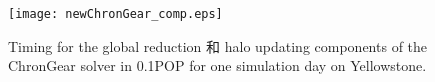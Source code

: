 \begin{figure}[!t]
\begin{center}
	\texttt{[image: newChronGear\_comp.eps]}
\end{center}
\vspace{-.2in}
\caption[] {Timing for the global reduction 和 halo updating components of the ChronGear
  solver in 0.1\degree\space POP for one simulation day on Yellowstone.}
\label{fig:ChronGearCOMP}
\vspace{-.1in}
\end{figure}

